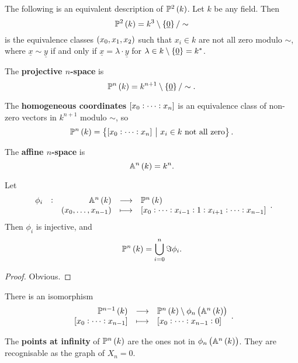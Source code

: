 The following is an equivalent description of $ \PP^2\br{k} $. Let $ k $ be any field. Then
$$ \PP^2\br{k} = k^3 \setminus \cbr{\underline{0}} / \sim $$
is the equivalence classes $ \br{x_0, x_1, x_2} $ such that $ x_i \in k $ are not all zero modulo $ \sim $, where $ \underline{x} \sim \underline{y} $ if and only if $ \underline{x} = \lambda \cdot \underline{y} $ for $ \lambda \in k \setminus \cbr{\underline{0}} = k^* $.

\begin{definition}
The \textbf{projective $ n $-space} is
$$ \PP^n\br{k} = k^{n + 1} \setminus \cbr{\underline{0}} / \sim. $$
\end{definition}

\begin{notation}
The \textbf{homogeneous coordinates} $ \sbr{x_0 : \dots : x_n} $ is an equivalence class of non-zero vectors in $ k^{n + 1} $ modulo $ \sim $, so
$$ \PP^n\br{k} = \cbr{\sbr{x_0 : \dots : x_n} \st x_i \in k \ \text{not all zero}}. $$
\end{notation}

\pagebreak

\begin{definition}
The \textbf{affine $ n $-space} is
$$ \AA^n\br{k} = k^n. $$
\end{definition}

\begin{lemma}
Let
$$ \function[\phi_i]{\AA^n\br{k}}{\PP^n\br{k}}{\br{x_0, \dots, x_{n - 1}}}{\sbr{x_0 : \dots : x_{i - 1} : 1 : x_{i + 1} : \dots : x_{n - 1}}}. $$
Then $ \phi_i $ is injective, and
$$ \PP^n\br{k} = \bigcup_{i = 0}^n \Im \phi_i. $$
\end{lemma}

\begin{proof}
Obvious.
\end{proof}

\begin{exercise}
There is an isomorphism
$$ \function{\PP^{n - 1}\br{k}}{\PP^n\br{k} \setminus \phi_n\br{\AA^n\br{k}}}{\sbr{x_0 : \dots : x_{n - 1}}}{\sbr{x_0 : \dots : x_{n - 1} : 0}}. $$
\end{exercise}

\begin{definition}
The \textbf{points at infinity} of $ \PP^n\br{k} $ are the ones not in $ \phi_n\br{\AA^n\br{k}} $. They are recognisable as the graph of $ X_n = 0 $.
\end{definition}


